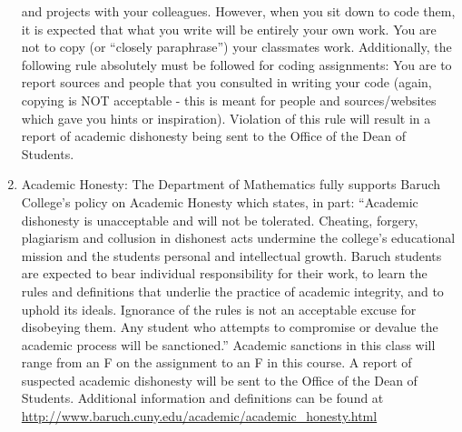 \documentclass[a4paper]{article}
\begin{document}
\begin{enumerate}
    and projects with your colleagues. However, when you sit down to code them, it is expected that
    what you write will be entirely your own work. You are not to copy (or “closely paraphrase”)
    your classmates work.
    Additionally, the following rule absolutely must be followed for coding assignments:
    You are to report sources and people that you consulted in writing your code (again,
    copying is NOT acceptable - this is meant for people and sources/websites which gave
    you hints or inspiration).
    Violation of this rule will result in a report of academic dishonesty being sent to the Office of the
    Dean of Students.
    \item Academic Honesty: The Department of Mathematics fully supports Baruch College's policy on
    Academic Honesty which states, in part: “Academic dishonesty is unacceptable and will not be
    tolerated. Cheating, forgery, plagiarism and collusion in dishonest acts undermine the college's
    educational mission and the students personal and intellectual growth. Baruch students are
    expected to bear individual responsibility for their work, to learn the rules and definitions that
    underlie the practice of academic integrity, and to uphold its ideals. Ignorance of the rules is not
    an acceptable excuse for disobeying them. Any student who attempts to compromise or devalue
    the academic process will be sanctioned.”
    Academic sanctions in this class will range from an F on the assignment to an F in this course.
    A report of suspected academic dishonesty will be sent to the Office of the Dean of Students.
    Additional information and definitions can be found at
    \url{http://www.baruch.cuny.edu/academic/academic\_honesty.html} 
\end{enumerate}
\end{document}

